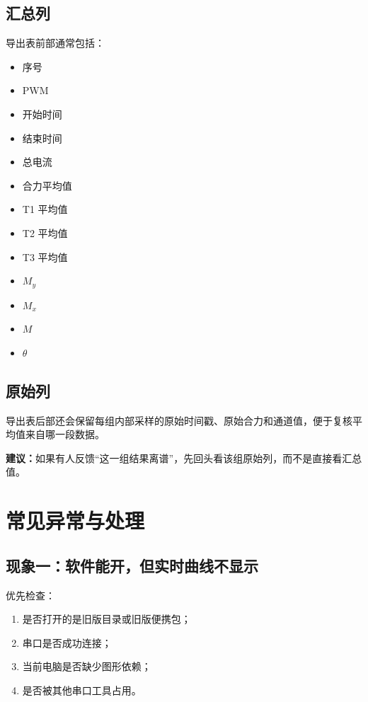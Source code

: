 \documentclass[11pt,a4paper]{ctexart}
\begin{document}
\subsection{汇总列}

导出表前部通常包括：

\begin{itemize}[leftmargin=2em]
  \item 序号
  \item PWM
  \item 开始时间
  \item 结束时间
  \item 总电流
  \item 合力平均值
  \item T1 平均值
  \item T2 平均值
  \item T3 平均值
  \item \(M_y\)
  \item \(M_x\)
  \item \(M\)
  \item \(\theta\)
\end{itemize}

\subsection{原始列}

导出表后部还会保留每组内部采样的原始时间戳、原始合力和通道值，便于复核平均值来自哪一段数据。

\textbf{建议：}如果有人反馈“这一组结果离谱”，先回头看该组原始列，而不是直接看汇总值。

\section{常见异常与处理}

\subsection{现象一：软件能开，但实时曲线不显示}

优先检查：
\begin{enumerate}[leftmargin=2em]
  \item 是否打开的是旧版目录或旧版便携包；
  \item 串口是否成功连接；
  \item 当前电脑是否缺少图形依赖；
  \item 是否被其他串口工具占用。
\end{enumerate}
\end{document}

